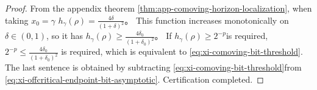 \begin{proof}
From the appendix theorem \ref{thm:app-comoving-horizon-localization}, when taking \(x_0=\gamma\)
\(
h_{\gamma}(\rho)=\frac{4\delta}{(1+\delta)^2}
\)。
This function increases monotonically on \(\delta\in(0,1)\), so it has
\(
h_{\gamma}(\rho)\ge \frac{4\delta_0}{(1+\delta_0)^2}
\)。
If \(h_{\gamma}(\rho)\ge 2^{-p}\) ​​is required, \(2^{-p}\le \frac{4\delta_0}{(1+\delta_0)^2}\) is required, which is equivalent to \eqref{eq:xi-comoving-bit-threshold}.
The last sentence is obtained by subtracting \eqref{eq:xi-comoving-bit-threshold} ​​from \eqref{eq:xi-offcritical-endpoint-bit-asymptotic}. Certification completed.
\end{proof}
